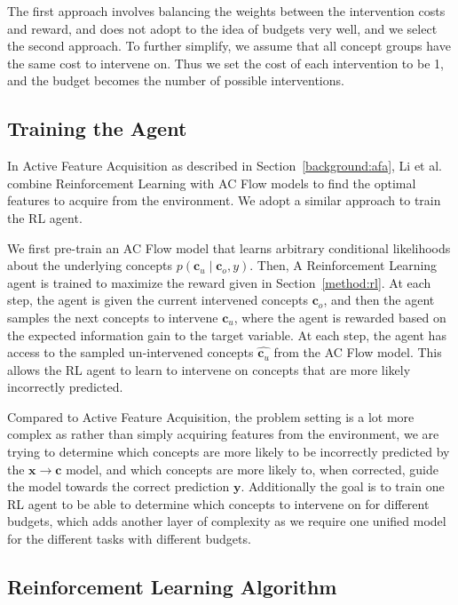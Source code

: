 The first approach
involves balancing the weights between the intervention costs and reward, and does not 
adopt to the idea of budgets very well, and we select the second approach.
To further simplify, we assume that all concept groups have the same cost
to intervene on. Thus we set the cost of each intervention to be 1, and the budget
becomes the number of possible interventions.

\subsection{Training the Agent}

In Active Feature Acquisition as described in Section~\ref{background:afa},
Li et al.~\cite{afa} combine Reinforcement Learning with 
AC Flow models to find the optimal features to acquire 
from the environment. We
adopt a similar approach to train the RL agent.

We first pre-train an AC Flow model that learns 
arbitrary conditional likelihoods about the underlying
concepts $p(\mathbf{c}_u \mid \mathbf{c}_o, y)$. 
Then, A Reinforcement Learning agent is trained to maximize 
the reward given in Section~\ref{method:rl}. 
At each
step, the agent is given the current intervened concepts $\mathbf{c}_o$, 
and then the agent samples the next 
concepts to intervene $\mathbf{c}_u$, 
where the agent is rewarded based on the expected information gain
to the target variable.
At each step, the agent has access to the sampled un-intervened concepts $\hat{\mathbf{c}_u}$ 
from the AC Flow model. This allows the RL agent to learn to intervene on concepts that are 
more likely incorrectly predicted.

Compared to Active Feature Acquisition, the problem setting is a lot more complex as
rather than simply acquiring features from the environment, we are trying to determine
which concepts are more likely to be incorrectly predicted by the $\mathbf{x} \to \mathbf{c}$ model, 
and
which concepts are more likely to, when corrected, guide the model towards the correct prediction
 $\mathbf{y}$.
Additionally the goal is to train one RL agent to be able to determine which concepts
to intervene on for different budgets, which adds another layer of complexity as we require
one unified model for the different tasks with different budgets.

\subsection{Reinforcement Learning Algorithm}

